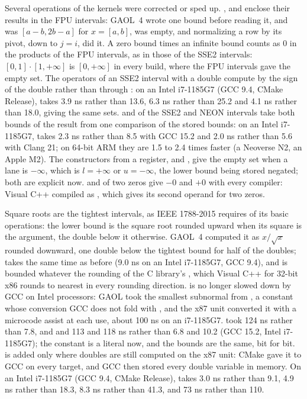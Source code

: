 \documentclass[12pt,a4paper,twoside,openright]{book}
\begin{document}
\medskip
Several operations of the kernels were corrected or sped up.\newinvfive{}
,  and  enclose their results in the
FPU intervals: GAOL~4 wrote one bound before reading it, and 
was $[a - b, 2b - a]$ for $x = [a, b]$, \code{[0.1] /= [0.1]} was empty, and
normalizing a row by its pivot,  down to $j = i$, did
it. A zero bound times an infinite bound counts as 0 in the products of the
FPU intervals, as in those of the SSE2 intervals: $[0, 1] \cdot [1, +\infty]$
is $[0, +\infty]$ in every build, where the FPU intervals gave the empty set.
The operators of an SSE2 interval with a double compute by the sign of the
double rather than through : on an Intel i7-1185G7 (GCC
9.4, CMake Release),  takes 3.9 ns rather than 13.6,
 6.3 ns rather than 25.2 and  4.1 ns rather than
18.0, giving the same sets.  and  of the SSE2
and NEON intervals take both bounds of the result from one comparison of the
stored bounds: on an Intel i7-1185G7,  takes 2.3 ns rather
than 8.5 with GCC 15.2 and 2.0 ns rather than 5.6 with Clang 21; on 64-bit
ARM they are 1.5 to 2.4 times faster (a Neoverse N2, an Apple M2). The
constructors from a register,  and
, give the empty set when a lane is
$-\infty$, which is $l = +\infty$ or $u = -\infty$, the lower bound being
stored negated; both are explicit now.
 and  of two zeros give $-0$ and $+0$ with
every compiler: Visual C++ compiled  as ,
which gives its second operand for two zeros.

\medskip
Square roots are the tightest intervals, as IEEE 1788-2015 requires of its
basic operations: the lower bound is the square root rounded upward when its
square is the argument, the double below it otherwise.\newinvfive{} GAOL~4
computed it as $x/\sqrt{x}$ rounded downward, one double below the tightest
bound for half of the doubles;  takes the same time as before
(9.0 ns on an Intel i7-1185G7, GCC 9.4), and is bounded whatever the rounding
of the C library's , which Visual C++ for 32-bit x86 rounds to
nearest in every rounding direction.  is no longer slowed down
by GCC on Intel processors: GAOL took the smallest subnormal from
, a 
constant whose conversion GCC does not fold with ,
and the x87 unit converted it with a microcode assist at each use, about
100 ns on an i7-1185G7.  took 124 ns rather than 7.8, and
 and  113 and 118 ns rather than
6.8 and 10.2 (GCC 15.2, Intel i7-1185G7); the constant is a literal now, and
the bounds are the same, bit for bit.  is added only
where doubles are still computed on the x87 unit: CMake gave it to GCC on
every target, and GCC then stored every double variable in memory. On an
Intel i7-1185G7 (GCC 9.4, CMake Release),  takes 3.0 ns rather
than 9.1,  4.9 ns rather than 18.3,  8.3 ns rather
than 41.3, and  73 ns rather than 110.
\end{document}
